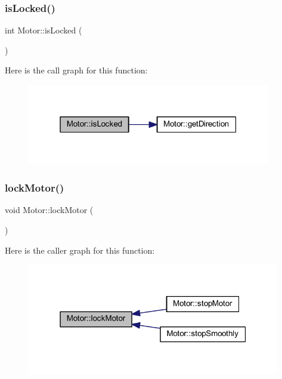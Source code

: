 \subsubsection{\texorpdfstring{is\+Locked()}{isLocked()}}
{\footnotesize\ttfamily int Motor\+::is\+Locked (\begin{DoxyParamCaption}{ }\end{DoxyParamCaption})}

Here is the call graph for this function\+:
\nopagebreak
\begin{figure}[H]
\begin{center}
\leavevmode
\includegraphics[width=301pt]{d1/d6b/class_motor_a7429cc5bd67dd69077008674eda80f2d_cgraph}
\end{center}
\end{figure}
\mbox{\label{class_motor_ad94e80f3e3918fa6aed53744f3339d0c}} 
\subsubsection{\texorpdfstring{lock\+Motor()}{lockMotor()}}
{\footnotesize\ttfamily void Motor\+::lock\+Motor (\begin{DoxyParamCaption}{ }\end{DoxyParamCaption})}

Here is the caller graph for this function\+:
\nopagebreak
\begin{figure}[H]
\begin{center}
\leavevmode
\includegraphics[width=313pt]{d1/d6b/class_motor_ad94e80f3e3918fa6aed53744f3339d0c_icgraph}
\end{center}
\end{figure}
\mbox{\label{class_motor_a81fada8275a8cd70805a9808314e7bee}} 
